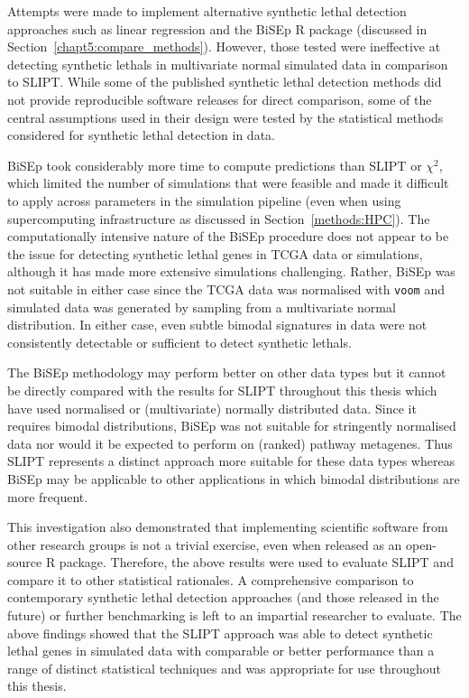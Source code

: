 Attempts were made to implement alternative \gls{synthetic lethal} detection approaches such as linear regression and the \gls{BiSEp} R package (discussed in Section~\ref{chapt5:compare_methods}). However, those tested were ineffective at detecting \glspl{synthetic lethal} in multivariate normal simulated data in comparison to \gls{SLIPT}. While some of the published \gls{synthetic lethal} detection methods \citep{Jerby2014, Lu2015} did not provide reproducible software releases for direct comparison, some of the central assumptions used in their design were tested by the statistical methods considered for \gls{synthetic lethal} detection in  data.  

\gls{BiSEp} took considerably more time to compute predictions than \gls{SLIPT} or $\chi^2$, which limited the number of simulations that were feasible and made it difficult to apply across parameters in the simulation pipeline (even when using supercomputing infrastructure as discussed in Section~\ref{methods:HPC}). The computationally intensive nature of the \gls{BiSEp} procedure does not appear to be the issue for detecting \gls{synthetic lethal} genes in \gls{TCGA} data or simulations, although it has made more extensive simulations challenging. Rather, \gls{BiSEp} was not suitable in either case since the \gls{TCGA} data was normalised with \texttt{voom} \citep{limma} and simulated data was generated by sampling from a multivariate normal distribution. In either case, even subtle bimodal signatures in  data were not consistently detectable or sufficient to detect \glspl{synthetic lethal}.

The \gls{BiSEp} methodology may perform better on other data types but it cannot be directly compared with the results for \gls{SLIPT} throughout this thesis which have used normalised or (multivariate) normally distributed data. Since it requires bimodal distributions, \gls{BiSEp} was not suitable for stringently normalised  data nor would it be expected to perform on (ranked) pathway \glspl{metagene}. Thus \gls{SLIPT} represents a distinct approach more suitable for these data types whereas \gls{BiSEp} may be applicable to other applications in which bimodal distributions are more frequent.

This investigation also demonstrated that implementing scientific software from other research groups is not a trivial exercise, even when released as an open-source R package. Therefore, the above results were used to evaluate \gls{SLIPT} and compare it to other statistical rationales. A comprehensive comparison to contemporary \gls{synthetic lethal} detection approaches (and those released in the future) or further benchmarking is left to an impartial researcher to evaluate. The above findings showed that the \gls{SLIPT} approach was able to detect \gls{synthetic lethal} genes in simulated data with comparable or better performance than a range of distinct statistical techniques and was appropriate for use throughout this thesis.  

